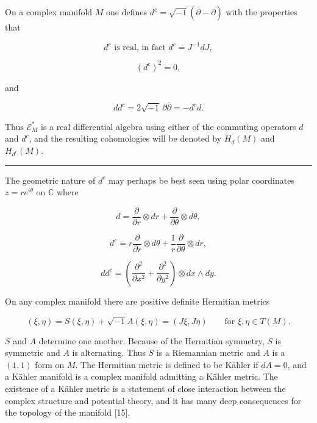\documentclass[
  english,
  a3paper,
  a3paper]{extarticle}
\begin{document}
On a complex manifold \(M\) one defines
\(d^c=\sqrt{-1}(\bar\partial-\partial)\) with the properties that

\[d^c\text{ is real, in fact }d^c=J^{-1}dJ,\]

\[(d^c)^2=0,\]

and

\[dd^c=2\sqrt{-1}\,\partial\bar\partial=-d^cd.\]

Thus \(\mathcal E_M^*\) is a real differential algebra using either of
the commuting operators \(d\) and \(d^c\), and the resulting
cohomologies will be denoted by \(H_d(M)\) and \(H_{d^c}(M)\).

\clearpage



\par

\vspace{0.7mm}\hrule\vspace{1.6mm}

\fontsize{9}{11}\selectfont

The geometric nature of \(d^c\) may perhaps be best seen using polar
coordinates \(z=re^{i\theta}\) on \(\mathbb C\) where

\[d=\frac{\partial}{\partial r}\otimes dr+\frac{\partial}{\partial\theta}\otimes d\theta,\]

\[d^c=r\frac{\partial}{\partial r}\otimes d\theta+\frac{1}{r}\frac{\partial}{\partial\theta}\otimes dr,\]

\[dd^c=\left(\frac{\partial^2}{\partial x^2}+\frac{\partial^2}{\partial y^2}\right)\otimes dx\wedge dy.\]

On any complex manifold there are positive definite Hermitian metrics

\[(\xi,\eta)=S(\xi,\eta)+\sqrt{-1}A(\xi,\eta)=(J\xi,J\eta)\qquad\text{for }\xi,\eta\in T(M).\]

\(S\) and \(A\) determine one another. Because of the Hermitian
symmetry, \(S\) is symmetric and \(A\) is alternating. Thus \(S\) is a
Riemannian metric and \(A\) is a \((1,1)\) form on \(M\). The Hermitian
metric is defined to be Kähler if \(dA=0\), and a Kähler manifold is a
complex manifold admitting a Kähler metric. The existence of a Kähler
metric is a statement of close interaction between the complex structure
and potential theory, and it has many deep consequences for the topology
of the manifold {[}15{]}.
\end{document}
